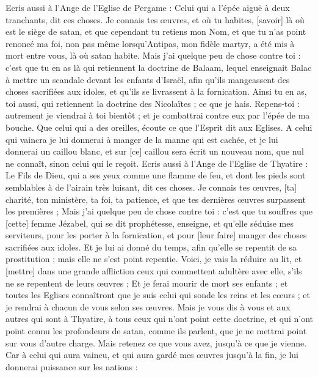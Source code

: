 \begin{multicols}{2}
Ecris aussi à l'Ange de l'Eglise de Pergame : Celui qui a l'épée aiguë à deux tranchants, dit ces choses.
Je connais tes œuvres, et où tu habites, [savoir] là où est le siège de satan, et que cependant tu retiens mon Nom, et que tu n'as point renoncé ma foi, non pas même lorsqu'Antipas, mon fidèle martyr, a été mis à mort entre vous, là où satan habite.
Mais j'ai quelque peu de chose contre toi : c'est que tu en as là qui retiennent la doctrine de Balaam, lequel enseignait Balac à mettre un scandale devant les enfants d'Israël, afin qu'ils mangeassent des choses sacrifiées aux idoles, et qu'ils se livrassent à la fornication.
Ainsi tu en as, toi aussi, qui retiennent la doctrine des Nicolaïtes ; ce que je hais.
Repens-toi : autrement je viendrai à toi bientôt ; et je combattrai contre eux par l'épée de ma bouche.
Que celui qui a des oreilles, écoute ce que l'Esprit dit aux Eglises. A celui qui vaincra je lui donnerai à manger de la manne qui est cachée, et je lui donnerai un caillou blanc, et sur [ce] caillou sera écrit un nouveau nom, que nul ne connaît, sinon celui qui le reçoit.
Ecris aussi à l'Ange de l'Eglise de Thyatire : Le Fils de Dieu, qui a ses yeux comme une flamme de feu, et dont les pieds sont semblables à de l'airain très luisant, dit ces choses.
Je connais tes œuvres, [ta] charité, ton ministère, ta foi, ta patience, et que tes dernières œuvres surpassent les premières ;
Mais j'ai quelque peu de chose contre toi : c'est que tu souffres que [cette] femme Jézabel, qui se dit prophétesse, enseigne, et qu'elle séduise mes serviteurs, pour les porter à la fornication, et pour [leur faire] manger des choses sacrifiées aux idoles.
Et je lui ai donné du temps, afin qu'elle se repentit de sa prostitution ; mais elle ne s'est point repentie.
Voici, je vais la réduire au lit, et [mettre] dans une grande affliction ceux qui commettent adultère avec elle, s'ils ne se repentent de leurs œuvres ;
Et je ferai mourir de mort ses enfants ; et toutes les Eglises connaîtront que je suis celui qui sonde les reins et les cœurs ; et je rendrai à chacun de vous selon ses œuvres.
Mais je vous dis à vous et aux autres qui sont à Thyatire, à tous ceux qui n'ont point cette doctrine, et qui n'ont point connu les profondeurs de satan, comme ils parlent, que je ne mettrai point sur vous d'autre charge.
Mais retenez ce que vous avez, jusqu'à ce que je vienne.
Car à celui qui aura vaincu, et qui aura gardé mes œuvres jusqu'à la fin, je lui donnerai puissance sur les nations :

\end{multicols}
